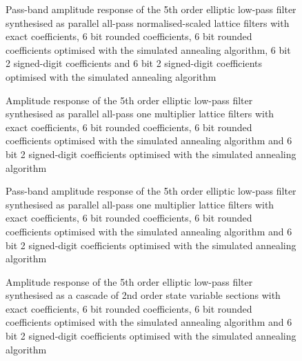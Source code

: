 \documentclass[a4paper,twoside,10pt,english]{report}
\begin{document}
\begin{figure}[!htbp]
\begin{center}
\scalebox{0.7}{}
\caption{Pass-band amplitude response of the 5th order elliptic low-pass filter
synthesised as parallel all-pass normalised-scaled lattice filters with exact
coefficients, 6 bit rounded coefficients, 6 bit rounded coefficients
optimised with the simulated annealing algorithm, 6 bit 2 signed-digit
coefficients and 6 bit 2 signed-digit coefficients optimised with the
simulated annealing algorithm}
\label{fig:samin_NSPA_lattice_passband_response}
\end{center}
\end{figure}
\begin{figure}[!htbp]
\begin{center}
\scalebox{0.7}{}
\caption{Amplitude response of the 5th order elliptic low-pass filter 
synthesised as parallel all-pass one multiplier lattice filters with exact
coefficients, 6 bit rounded coefficients, 6 bit rounded coefficients
optimised with the simulated annealing algorithm and 6 bit 2 signed-digit 
coefficients optimised with the simulated annealing algorithm}
\label{fig:samin_OneMPA_lattice_response}
\end{center}
\end{figure}
\begin{figure}[!htbp]
\begin{center}
\scalebox{0.7}{}
\caption{Pass-band amplitude response of the 5th order elliptic low-pass filter
synthesised as parallel all-pass one multiplier lattice filters with exact
coefficients, 6 bit rounded coefficients, 6 bit rounded coefficients
optimised with the simulated annealing algorithm and 6 bit 2 signed-digit 
coefficients optimised with the simulated annealing algorithm}
\label{fig:samin_OneMPA_lattice_passband_response}
\end{center}
\end{figure}
\begin{figure}[!htbp]
\begin{center}
\scalebox{0.7}{}
\caption{Amplitude response of the 5th order elliptic low-pass
filter synthesised as a cascade of 2nd order state variable sections with 
exact coefficients, 6 bit rounded coefficients, 6 bit rounded coefficients 
optimised with the simulated annealing algorithm
and 6 bit 2 signed-digit coefficients optimised with the simulated annealing
algorithm}
\label{fig:samin_svcasc_response}
\end{center}
\end{figure}
\end{document}
